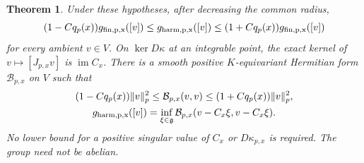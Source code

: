 \documentclass[11pt]{amsart}
\newtheorem{theorem}{Theorem}[section]
\theoremstyle{definition}
\theoremstyle{remark}
\newcommand{\im}{\operatorname{im}}
\begin{document}
\begin{theorem}\label{thm:relative}
Under these hypotheses, after decreasing the common radius,
\begin{equation}\label{eq:general-relative}
 (1-Cq_p(x))g_{\rm fin,p,x}([v])
 \le g_{\rm harm,p,x}([v])
 \le(1+Cq_p(x))g_{\rm fin,p,x}([v])
\end{equation}
for every ambient $v\in V$. On $\ker D\kappa$ at an integrable point,
the exact kernel of $v\mapsto[J_{p,x}v]$ is $\im C_x$.
There is a smooth positive $K$-equivariant Hermitian form
$\mathcal B_{p,x}$ on $V$ such that
\begin{gather}
 (1-Cq_p(x))\|v\|_p^2\le\mathcal B_{p,x}(v,v)
 \le(1+Cq_p(x))\|v\|_p^2,\label{eq:ambient-positive}\\
 g_{\rm harm,p,x}([v])=
 \inf_{\xi\in\mathfrak g}
 \mathcal B_{p,x}(v-C_x\xi,v-C_x\xi).\label{eq:ambient-quotient}
\end{gather}
No lower bound for a positive singular value of $C_x$ or $D\kappa_{p,x}$
is required. The group need not be abelian.
\end{theorem}
\end{document}
